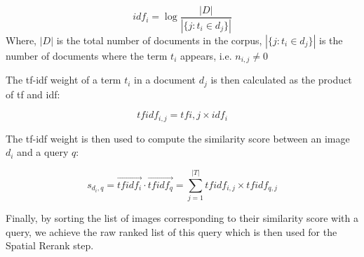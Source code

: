 \begin{equation}
        idf_{i} = \log{\frac{\left|D\right|}{\left|\{j: t_{i} \in d_{j}\}\right|}}
\end{equation}
Where, $\left|D\right|$ is the total number of documents in the corpus, $\left|\{j: t_{i} \in d_{j}\}\right|$ is the number of documents where the term $t_{i}$ appears, i.e. $n_{i, j} \ne 0$

The tf-idf weight of a term $t_{i}$ in a document $d_{j}$ is then calculated as the product of tf and idf:

\begin{equation}
{tfidf}_{i, j} = tf{i, j} \times idf_{i}
\end{equation}

The tf-idf weight is then used to compute the similarity score between an image $d_{i}$ and a query $q$:

\begin{equation}
s_{d_{i}, q} = \vec{{tfidf}_{i}} \cdot \vec{{tfidf}_{q}} = \sum\limits_{j = 1}^{\left|T\right|} {tfidf}_{i, j} \times {tfidf}_{q, j}
\end{equation} 

Finally, by sorting the list of images corresponding to their similarity score with a query, we achieve the raw ranked list of this query which is then used for the Spatial Rerank step.